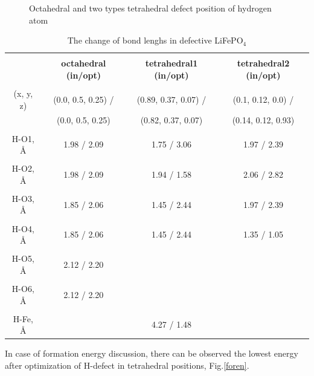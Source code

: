 \begin{figure}[h]
\begin{minipage}[h]{0.3\linewidth}
\end{minipage}
\caption{Octahedral and two types tetrahedral defect position of hydrogen atom}
\label{tabular:def}
\end{figure}

\begin{table}[h]
\footnotesize{
\caption{The change of bond lenghs in defective LiFePO$_4$}
\label{tabular:change}
\begin{center}
\begin{tabular}{|c|c|c|c|}
\hline
& & & \\
 \textbf{ } & \textbf{octahedral (in/opt)}& \textbf{tetrahedral1 (in/opt)}  & \textbf{tetrahedral2 (in/opt)}  \\
\hline
& & & \\
(x, y, z) & (0.0, 0.5, 0.25) / &  (0.89, 0.37, 0.07) /  & (0.1, 0.12, 0.0) /  \\ 
 & (0.0, 0.5, 0.25)  &   (0.82, 0.37, 0.07) & (0.14, 0.12, 0.93) \\ 
\hline
& & & \\
H-O1, \AA & 1.98 / 2.09 &  1.75 / 3.06 & 1.97 / 2.39 \\ 
\hline
& & & \\
H-O2, \AA & 1.98 / 2.09 & 1.94 / 1.58 & 2.06 / 2.82 \\
\hline
& & & \\
H-O3, \AA & 1.85 / 2.06 & 1.45 / 2.44 & 1.97 / 2.39 \\
\hline
& & & \\
H-O4, \AA & 1.85 / 2.06 & 1.45 / 2.44 & 1.35 / 1.05 \\
\hline
& & & \\
H-O5, \AA & 2.12 / 2.20 &  &  \\
\hline
& & & \\
H-O6, \AA & 2.12 / 2.20 & & \\
\hline
& & & \\
H-Fe, \AA &  & 4.27 / 1.48 &  \\
\hline
\end{tabular}
\end{center}
}
\end{table}

In case of formation energy discussion, there can be observed the lowest energy after optimization of H-defect in tetrahedral positions, Fig.\ref{foren}.

